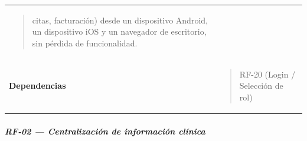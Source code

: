 \documentclass[
]{article}
\begin{document}
{\begin{longtable}[]{@{}
  >{\raggedright\arraybackslash}p{}
  >{\raggedright\arraybackslash}p{}@{}}
\begin{minipage}[t]{\linewidth}
\begin{quote}
citas, facturación) desde un dispositivo Android, un dispositivo iOS y
un navegador de escritorio, sin pérdida de funcionalidad.
\end{quote}
\end{minipage} \\
\textbf{Dependencias} & \begin{minipage}[t]{\linewidth}\raggedright
\begin{quote}
RF-20 (Login / Selección de rol)
\end{quote}
\end{minipage} \\
\end{longtable}
}

\subparagraph{RF-02 --- Centralización de información
clínica}\label{rf-02-centralizaciuxf3n-de-informaciuxf3n-cluxednica}
\end{document}
